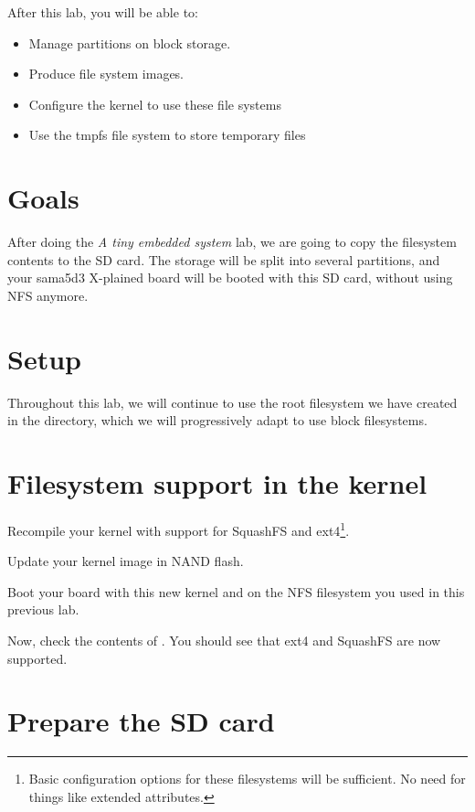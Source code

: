 
After this lab, you will be able to:
\begin{itemize}
\item Manage partitions on block storage.
\item Produce file system images.
\item Configure the kernel to use these file systems
\item Use the tmpfs file system to store temporary files
\end{itemize}

\section{Goals}

After doing the {\em A tiny embedded system} lab, we are going to copy
the filesystem contents to the SD card. The storage will be
split into several partitions, and your sama5d3 X-plained board will
be booted with this SD card, without using NFS anymore.

\section{Setup}

Throughout this lab, we will continue to use the root filesystem we
have created in the 
directory, which we will progressively adapt to use block filesystems.

\section{Filesystem support in the kernel}

Recompile your kernel with support for SquashFS and ext4\footnote{Basic
configuration options for these filesystems will be sufficient. No need
for things like extended attributes.}.

Update your kernel image in NAND flash.

Boot your board with this new kernel and on the NFS filesystem you
used in this previous lab.

Now, check the contents of . You should see
 that ext4 and SquashFS are now supported.

\section{Prepare the SD card}

